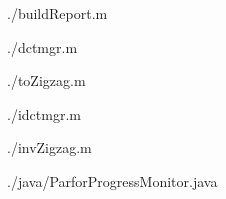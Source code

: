 \documentclass{article} %
\begin{document}
%


\clearpage
\appendix



{./buildReport.m} 

{./dctmgr.m} 

{./toZigzag.m} 

{./idctmgr.m} 

{./invZigzag.m} 

{./java/ParforProgressMonitor.java} 
\end{document}
